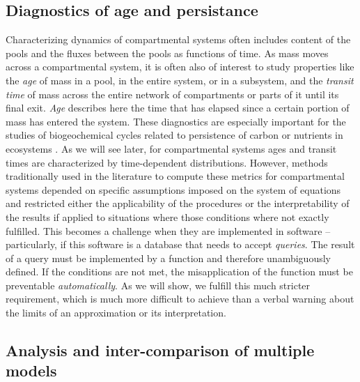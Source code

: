 \subsection{Diagnostics of age and persistance} 
Characterizing dynamics of compartmental systems often includes content of the pools
and the fluxes between the pools as functions of time.
As mass moves across a compartmental system, it is often also of interest to study
properties like the \emph{age} of mass in a pool, in the entire system,
or in a subsystem, and the \emph{transit time} of mass 
across the entire network of compartments or parts of it until its
final exit. \emph{Age} describes here the time that has elapsed since a certain portion of mass has entered the system. These diagnostics are especially important for the studies of biogeochemical cycles 
related to persistence of carbon or nutrients in ecosystems \citep{schmidt_persistence_2011, friedlingstein_uncertainties_2014, woolf_microbial_2019, kyker-snowman_stoichiometrically_2020}.
As we will see later, for compartmental systems ages and transit times are characterized by
time-dependent distributions.
However, methods traditionally used in the literature to compute these metrics for
compartmental systems depended on specific assumptions imposed on the system
of equations \citep{Sierra2017GCB} and restricted either the applicability 
of the procedures or the interpretability of the results if applied to situations 
where those conditions where not exactly fulfilled. 
This becomes a challenge when they  are implemented in software
-- particularly, if this software is a database that needs to accept \emph{queries}. The result of a query must be implemented by a function and therefore unambiguously defined. If the conditions are not met, the misapplication of the function must be preventable \emph{automatically}.
As we will show, we fulfill this much stricter requirement, which is much more difficult to achieve than a verbal warning about the limits of an approximation or its interpretation.


\subsection{Analysis and inter-comparison of multiple models}

